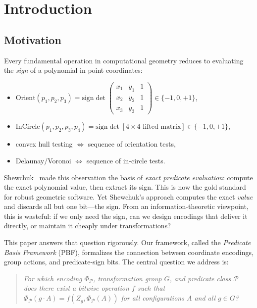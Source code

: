 \documentclass[11pt,letterpaper]{article}
\newcommand{\sign}{\mathrm{sign}}
\newcommand{\Orient}{\mathrm{Orient}}
\newcommand{\InCircle}{\mathrm{InCircle}}
\newcommand{\PhiP}{\Phi_{\mathcal{P}}}
\newcommand{\cP}{\mathcal{P}}
\begin{document}
\tableofcontents
\clearpage

\section{Introduction}\label{sec:intro}

\subsection{Motivation}

Every fundamental operation in computational geometry reduces to evaluating the
\emph{sign} of a polynomial in point coordinates:

\begin{itemize}[nosep]
\item $\Orient(p_1,p_2,p_3)=\sign\!\det\!\begin{pmatrix}x_1&y_1&1\\x_2&y_2&1\\x_3&y_3&1\end{pmatrix}
      \in\{-1,0,+1\}$,
\item $\InCircle(p_1,p_2,p_3,p_4)=\sign\det[4\!\times\!4\text{ lifted matrix}]
      \in\{-1,0,+1\}$,
\item convex hull testing $\Leftrightarrow$ sequence of orientation tests,
\item Delaunay/Voronoi $\Leftrightarrow$ sequence of in-circle tests.
\end{itemize}

Shewchuk~\cite{Shewchuk97} made this observation the basis of \emph{exact predicate
evaluation}: compute the exact polynomial value, then extract its sign.  This is now the
gold standard for robust geometric software.  Yet Shewchuk's approach computes the exact
\emph{value} and discards all but one bit---the sign.  From an information-theoretic
viewpoint, this is wasteful: if we only need the sign, can we design encodings that
deliver it directly, or maintain it cheaply under transformations?

This paper answers that question rigorously.  Our framework, called the
\emph{Predicate Basis Framework} (PBF), formalizes the connection between coordinate
encodings, group actions, and predicate-sign bits.  The central question we address is:

\begin{quote}
\emph{For which encoding $\PhiP$, transformation group $G$, and predicate class $\cP$
does there exist a bitwise operation $f$ such that
$\PhiP(g\cdot A)=f(Z_g,\PhiP(A))$ for all configurations $A$ and all $g\in G$?}
\end{quote}
\end{document}
